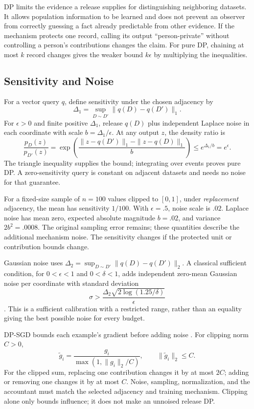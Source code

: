 DP limits the evidence a release supplies for distinguishing neighboring datasets. It allows population information to be learned and does not prevent an observer from correctly guessing a fact already predictable from other evidence. If the mechanism protects one record, calling its output ``person-private'' without controlling a person's contributions changes the claim. For pure DP, chaining at most $k$ record changes gives the weaker bound $k\epsilon$ by multiplying the inequalities.

\subsection{Sensitivity and Noise}

For a vector query $q$, define sensitivity under the chosen adjacency by
\[
\Delta_1=\sup_{D\sim D'}\|q(D)-q(D')\|_1.
\]
For $\epsilon>0$ and finite positive $\Delta_1$, release $q(D)$ plus independent Laplace noise in each coordinate with scale $b=\Delta_1/\epsilon$. At any output $z$, the density ratio is
\[
\frac{p_D(z)}{p_{D'}(z)}
=\exp\!\left(\frac{\|z-q(D')\|_1-\|z-q(D)\|_1}{b}\right)
\le e^{\Delta_1/b}=e^\epsilon.
\]
The triangle inequality supplies the bound; integrating over events proves pure DP. A zero-sensitivity query is constant on adjacent datasets and needs no noise for that guarantee.

For a fixed-size sample of $n=100$ values clipped to $[0,1]$, under \emph{replacement} adjacency, the mean has sensitivity $1/100$. With $\epsilon=.5$, noise scale is $.02$. Laplace noise has mean zero, expected absolute magnitude $b=.02$, and variance $2b^2=.0008$. The original sampling error remains; these quantities describe the additional mechanism noise. The sensitivity changes if the protected unit or contribution bounds change.

Gaussian noise uses $\Delta_2=\sup_{D\sim D'}\|q(D)-q(D')\|_2$. A classical sufficient condition, for $0<\epsilon<1$ and $0<\delta<1$, adds independent zero-mean Gaussian noise per coordinate with standard deviation
\[
\sigma>\frac{\Delta_2\sqrt{2\log(1.25/\delta)}}{\epsilon}
\]
\citep{dwork2014privacy}. This is a sufficient calibration with a restricted range, rather than an equality giving the best possible noise for every budget.

DP-SGD bounds each example's gradient before adding noise \citep{abadi2016}. For clipping norm $C>0$,
\[
\tilde g_i=\frac{g_i}{\max(1,\|g_i\|_2/C)},\qquad
\|\tilde g_i\|_2\le C.
\]
For the clipped sum, replacing one contribution changes it by at most $2C$; adding or removing one changes it by at most $C$. Noise, sampling, normalization, and the accountant must match the selected adjacency and training mechanism. Clipping alone only bounds influence; it does not make an unnoised release DP.

